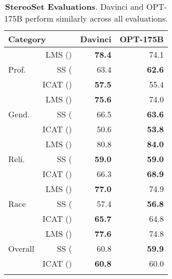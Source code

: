 \documentclass[11pt]{article}
\newcommand{\tablewhitespace}{\addlinespace[0.3em]}
\newcommand{\OPT}[0]{{OPT-175B}}
\newcommand{\davinci}[0]{{Davinci}}
\begin{document}
\begin{table}[t]
    \centering
    \begin{tabular}{lrrr}
        \toprule
        \multicolumn{2}{l}{{\bf Category}} & {\bf Davinci} & {\bf \OPT{}} \\
        \midrule
        \multirow{3}{*}{Prof.}   & LMS ()   & {\bf 78.4} & 74.1\\
                                 & SS  ( & {    63.4} & {\bf 62.6}\\
                                 & ICAT ()  & {\bf 57.5} & 55.4\\

        \cmidrule(lr){1-4}             
        \multirow{3}{*}{Gend.}   & LMS ()   & {\bf 75.6} & 74.0\\
                                 & SS  ( & {    66.5} & {\bf 63.6}\\
                                 & ICAT ()  & {    50.6} & {\bf 53.8}\\

        \cmidrule(lr){1-4}             
        \multirow{3}{*}{Reli.}   & LMS ()   & {    80.8} & {\bf 84.0}\\
                                 & SS  ( & {\bf 59.0} & {\bf 59.0}\\
                                 & ICAT ()  & {    66.3} & {\bf 68.9}\\

        \cmidrule(lr){1-4}             
        \multirow{3}{*}{Race}    & LMS ()   & {\bf 77.0} & 74.9\\
                                 & SS  ( & {    57.4} & {\bf 56.8}\\
                                 & ICAT ()  & {\bf 65.7} & 64.8\\

        \cmidrule(lr){1-4}             
        \multirow{3}{*}{Overall} & LMS ()   & {\bf 77.6} & 74.8\\
                                 & SS  ( & {    60.8} & {\bf 59.9}\\
                                 & ICAT ()  & {\bf 60.8} & 60.0\\

        \tablewhitespace
        \bottomrule
    \end{tabular}
    \caption{{\bf StereoSet Evaluations}. \davinci{} and \OPT{} perform similarly across all evaluations.}
    \label{tab:stereoset}
\end{table}
\end{document}

